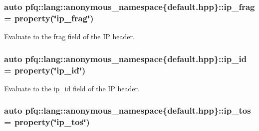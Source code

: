 \subsubsection[{\texorpdfstring{ip\+\_\+frag}{ip_frag}}]{\setlength{\rightskip}{0pt plus 5cm}auto pfq\+::lang\+::anonymous\+\_\+namespace\{default.\+hpp\}\+::ip\+\_\+frag = {\bf property}(\char`\"{}ip\+\_\+frag\char`\"{})}\hypertarget{namespacepfq_1_1lang_1_1anonymous__namespace_02default_8hpp_03_a46050d7137792fba0ca6d1b9cb75ad0d}{}\label{namespacepfq_1_1lang_1_1anonymous__namespace_02default_8hpp_03_a46050d7137792fba0ca6d1b9cb75ad0d}


Evaluate to the {\ttfamily frag} field of the IP header. 

\subsubsection[{\texorpdfstring{ip\+\_\+id}{ip_id}}]{\setlength{\rightskip}{0pt plus 5cm}auto pfq\+::lang\+::anonymous\+\_\+namespace\{default.\+hpp\}\+::ip\+\_\+id = {\bf property}(\char`\"{}ip\+\_\+id\char`\"{})}\hypertarget{namespacepfq_1_1lang_1_1anonymous__namespace_02default_8hpp_03_a87620275a9e9760978d5660be0582852}{}\label{namespacepfq_1_1lang_1_1anonymous__namespace_02default_8hpp_03_a87620275a9e9760978d5660be0582852}


Evaluate to the {\ttfamily ip\+\_\+id} field of the IP header. 

\subsubsection[{\texorpdfstring{ip\+\_\+tos}{ip_tos}}]{\setlength{\rightskip}{0pt plus 5cm}auto pfq\+::lang\+::anonymous\+\_\+namespace\{default.\+hpp\}\+::ip\+\_\+tos = {\bf property}(\char`\"{}ip\+\_\+tos\char`\"{})}\hypertarget{namespacepfq_1_1lang_1_1anonymous__namespace_02default_8hpp_03_acc5d2b786c39d4177ab37ee16ee2295d}{}\label{namespacepfq_1_1lang_1_1anonymous__namespace_02default_8hpp_03_acc5d2b786c39d4177ab37ee16ee2295d}


